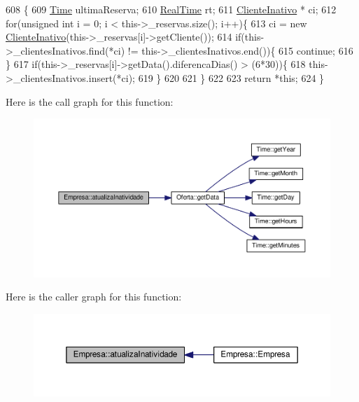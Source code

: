 \begin{DoxyCode}
608                                       \{
609     \hyperlink{classTime}{Time} ultimaReserva;
610     \hyperlink{classRealTime}{RealTime} rt;
611     \hyperlink{classClienteInativo}{ClienteInativo} * ci;
612     \textcolor{keywordflow}{for}(\textcolor{keywordtype}{unsigned} \textcolor{keywordtype}{int} i = 0; i < this->\_reservas.size(); i++)\{
613         ci = \textcolor{keyword}{new} \hyperlink{classClienteInativo}{ClienteInativo}(this->\_reservas[i]->getCliente());
614         \textcolor{keywordflow}{if}(this->\_clientesInativos.find(*ci) != this->\_clientesInativos.end())\{
615                 \textcolor{keywordflow}{continue};
616         \}
617         \textcolor{keywordflow}{if}(this->\_reservas[i]->getData().diferencaDias() > (6*30))\{
618             this->\_clientesInativos.insert(*ci);
619         \}
620 
621     \}
622 
623     \textcolor{keywordflow}{return} *\textcolor{keyword}{this};
624 \}
\end{DoxyCode}


Here is the call graph for this function\+:
\nopagebreak
\begin{figure}[H]
\begin{center}
\leavevmode
\includegraphics[width=350pt]{classEmpresa_aea372dbf680408d9fb32341c03b3e5ad_cgraph}
\end{center}
\end{figure}




Here is the caller graph for this function\+:
\nopagebreak
\begin{figure}[H]
\begin{center}
\leavevmode
\includegraphics[width=350pt]{classEmpresa_aea372dbf680408d9fb32341c03b3e5ad_icgraph}
\end{center}
\end{figure}


